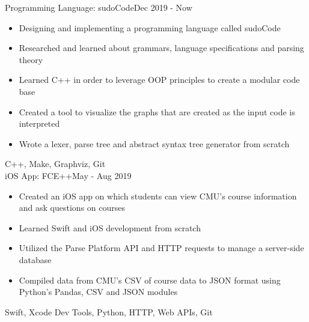 %
%
%


\begin{projects}

    \project
	{Programming Language: sudoCode}{Dec 2019 - Now}
	{
	    \begin{itemize}
            \item Designing and implementing a programming language called sudoCode
            \item Researched and learned about grammars, language specifications and parsing theory
            \item Learned C++ in order to leverage OOP principles to create a modular code base
            \item Created a tool to visualize the graphs that are created as the input code is interpreted
            \item Wrote a lexer, parse tree and abstract syntax tree generator from scratch
        \end{itemize}
    }
	{C++, Make, Graphviz, Git} \\

	\project
	{iOS App: FCE++}{May - Aug 2019}
	{
	    \begin{itemize}
            \item Created an iOS app on which students can view CMU’s course information and ask questions on courses
            \item Learned Swift and iOS development from scratch
            \item Utilized the Parse Platform API and HTTP requests to manage a server-side database
            \item Compiled data from CMU’s CSV of course data to JSON format using Python’s Pandas, CSV and JSON modules
        \end{itemize}
    }
    {Swift, Xcode Dev Tools, Python, HTTP, Web APIs, Git}

\end{projects}
